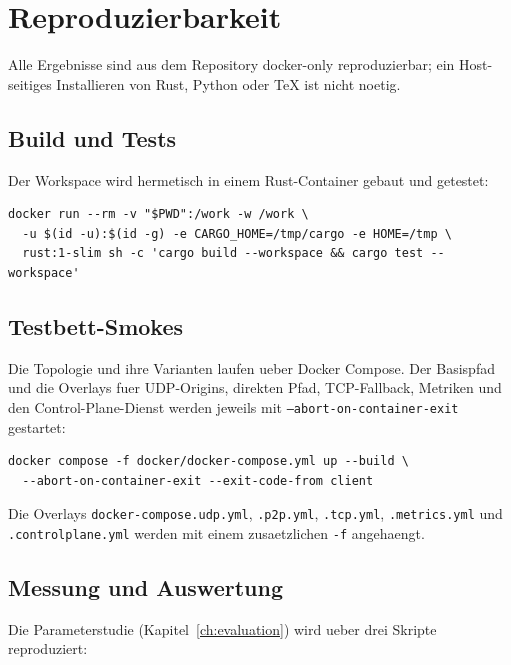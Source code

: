 \chapter{Reproduzierbarkeit}
\label{app:repro}

Alle Ergebnisse sind aus dem Repository docker-only reproduzierbar; ein
Host-seitiges Installieren von Rust, Python oder \TeX{} ist nicht noetig.

\section{Build und Tests}
\label{app:repro-build}

Der Workspace wird hermetisch in einem Rust-Container gebaut und getestet:

\begin{lstlisting}[caption={Hermetischer Build und Test des Workspace.}]
docker run --rm -v "$PWD":/work -w /work \
  -u $(id -u):$(id -g) -e CARGO_HOME=/tmp/cargo -e HOME=/tmp \
  rust:1-slim sh -c 'cargo build --workspace && cargo test --workspace'
\end{lstlisting}

\section{Testbett-Smokes}
\label{app:repro-compose}

Die Topologie und ihre Varianten laufen ueber Docker Compose. Der Basispfad und
die Overlays fuer UDP-Origins, direkten Pfad, TCP-Fallback, Metriken und den
Control-Plane-Dienst werden jeweils mit \texttt{--abort-on-container-exit}
gestartet:

\begin{lstlisting}[caption={Basis-Smoke der Topologie.}]
docker compose -f docker/docker-compose.yml up --build \
  --abort-on-container-exit --exit-code-from client
\end{lstlisting}

Die Overlays \texttt{docker-compose.udp.yml}, \texttt{.p2p.yml},
\texttt{.tcp.yml}, \texttt{.metrics.yml} und \texttt{.controlplane.yml} werden mit
einem zusaetzlichen \texttt{-f} angehaengt.

\section{Messung und Auswertung}
\label{app:repro-eval}

Die Parameterstudie (Kapitel~\ref{ch:evaluation}) wird ueber drei Skripte
reproduziert:

